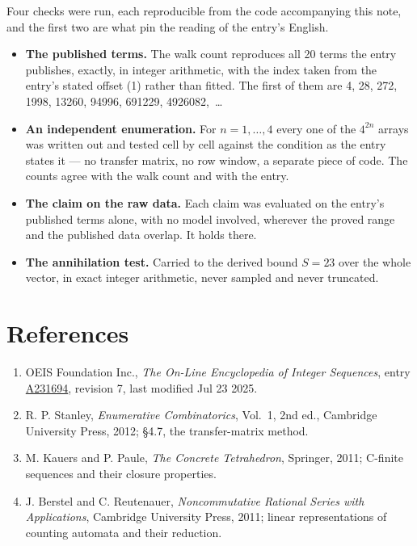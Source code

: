 \documentclass[11pt]{article}
\theoremstyle{definition}
\begin{document}
Four checks were run, each reproducible from the code accompanying this note, and the first two are what pin the reading of the entry's English.

\begin{itemize}

\item {\bfseries The published terms.} The walk count reproduces all 20 terms the entry publishes, exactly, in integer arithmetic, with the index taken from the entry's stated offset (1) rather than fitted. The first of them are 4, 28, 272, 1998, 13260, 94996, 691229, 4926082,~\dots

\item {\bfseries An independent enumeration.} For $n = 1,\dots,4$ every one of the $4^{2n}$ arrays was written out and tested cell by cell against the condition as the entry states it --- no transfer matrix, no row window, a separate piece of code. The counts agree with the walk count and with the entry.

\item {\bfseries The claim on the raw data.} Each claim was evaluated on the entry's published terms alone, with no model involved, wherever the proved range and the published data overlap. It holds there.

\item {\bfseries The annihilation test.} Carried to the derived bound $S = 23$ over the whole vector, in exact integer arithmetic, never sampled and never truncated.

\end{itemize}

\section{References}

\begin{enumerate}

\item OEIS Foundation Inc., \emph{The On-Line Encyclopedia of Integer Sequences}, entry \href{https://oeis.org/A231694}{A231694}, revision 7, last modified Jul 23 2025.

\item R. P. Stanley, \emph{Enumerative Combinatorics}, Vol.~1, 2nd ed., Cambridge University Press, 2012; \S4.7, the transfer-matrix method.

\item M. Kauers and P. Paule, \emph{The Concrete Tetrahedron}, Springer, 2011; C-finite sequences and their closure properties.

\item J. Berstel and C. Reutenauer, \emph{Noncommutative Rational Series with Applications}, Cambridge University Press, 2011; linear representations of counting automata and their reduction.

\end{enumerate}
\end{document}
